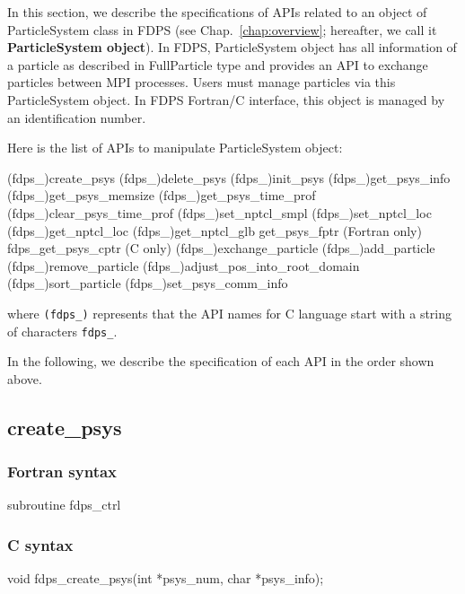 In this section, we describe the specifications of APIs related to an object of ParticleSystem class in FDPS (see Chap.~\ref{chap:overview}; hereafter, we call it \textbf{ParticleSystem object}). In FDPS, ParticleSystem object has all information of a particle as described in FullParticle type and provides an API to exchange particles between MPI processes. Users must manage particles via this ParticleSystem object. In FDPS Fortran/C interface, this object is managed by an identification number.

Here is the list of APIs to manipulate ParticleSystem object:
\begin{screen}
\begin{spverbatim}
(fdps_)create_psys
(fdps_)delete_psys
(fdps_)init_psys
(fdps_)get_psys_info
(fdps_)get_psys_memsize
(fdps_)get_psys_time_prof
(fdps_)clear_psys_time_prof
(fdps_)set_nptcl_smpl
(fdps_)set_nptcl_loc
(fdps_)get_nptcl_loc
(fdps_)get_nptcl_glb
get_psys_fptr (Fortran only)
fdps_get_psys_cptr (C only)
(fdps_)exchange_particle
(fdps_)add_particle 
(fdps_)remove_particle
(fdps_)adjust_pos_into_root_domain
(fdps_)sort_particle
(fdps_)set_psys_comm_info
\end{spverbatim}
\end{screen}
where \texttt{(fdps\_)} represents that the API names for C language start with a string of characters \texttt{fdps\_}.

In the following, we describe the specification of each API in the order shown above.
\clearpage


\subsection{create\_psys}
\subsubsection*{Fortran syntax}
\begin{screen}
\begin{spverbatim}
subroutine fdps_ctrl%
\end{spverbatim}
\end{screen}

\subsubsection*{C syntax}
\begin{screen}
\begin{spverbatim}
void fdps_create_psys(int *psys_num,
                      char *psys_info);
\end{spverbatim}
\end{screen}

